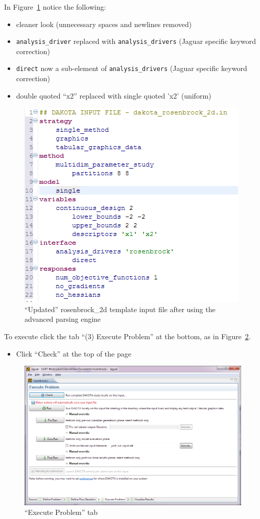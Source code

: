 In Figure~\ref{fig:input:3fixed} notice the following:
\begin{itemize}
\item cleaner look (unnecessary spaces and newlines removed)
\item \texttt{analysis\_driver} replaced with \texttt{analysis\_drivers} (Jaguar specific keyword correction)
\item \texttt{direct} now a sub-element of \texttt{analysis\_drivers} (Jaguar specific keyword correction)
\item double quoted ``x2'' replaced with single quoted 'x2' (uniform)
\end{itemize}
\begin{figure}[htbp]
  \centering
  \includegraphics[scale=0.6]{images/3fixed}
  \caption{``Updated'' rosenbrock\_2d template input file after using the advanced parsing engine}
  \label{fig:input:3fixed}
\end{figure}      

 
To execute click the tab ``(3) Execute Problem'' at the bottom, as in Figure~\ref{fig:input:4ExecuteProblem}. 
\begin{itemize}
\item Click ``Check'' at the top of the page
\end{itemize}
\begin{figure}[htbp]
  \centering
  \includegraphics[scale=0.6]{images/4ExecuteProblem}
  \caption{``Execute Problem'' tab}
  \label{fig:input:4ExecuteProblem}
\end{figure}


